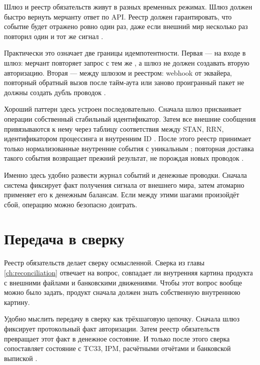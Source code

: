 Шлюз и реестр обязательств живут в разных временных режимах. Шлюз должен быстро
вернуть мерчанту ответ по API. Реестр должен гарантировать, что событие
будет отражено ровно один раз, даже если внешний мир несколько раз
повторил один и тот же сигнал \cite{stripe-idempotency,adyen-api-idempotency}.

Практически это означает две границы идемпотентности. Первая —
на входе в шлюз: мерчант повторяет запрос с тем же
, а шлюз не должен создавать вторую
авторизацию. Вторая — между шлюзом и реестром: webhook от эквайера,
повторный обратный вызов после тайм-аута или заново проигранный пакет не должны
создать дубль проводок \cite{stripe-idempotency,adyen-api-idempotency,stripe-webhooks}.

Хороший паттерн здесь устроен последовательно. Сначала шлюз
присваивает операции собственный стабильный идентификатор. Затем
все внешние сообщения привязываются к нему через таблицу соответствия
между STAN, RRN, идентификатором процессинга и внутренним ID
\cite{fis-iso8583-guide-2023}.
После этого реестр принимает только нормализованные внутренние
события с уникальным ; повторная доставка
такого события возвращает прежний результат, не порождая новых
проводок \cite{stripe-webhooks}.

Именно здесь удобно развести журнал событий и денежные проводки.
Сначала система фиксирует факт получения сигнала от внешнего мира,
затем атомарно применяет его к денежным балансам. Если между этими
шагами произойдёт сбой, операцию можно безопасно доиграть.

\section{Передача в сверку}
\label{sec:ledger-handoff}

Реестр обязательств делает сверку осмысленной.
Сверка из главы \ref{ch:reconciliation} отвечает на вопрос,
совпадает ли внутренняя картина продукта с внешними файлами
и банковскими движениями. Чтобы этот вопрос вообще можно было
задать, продукт сначала должен знать собственную внутреннюю картину.

Удобно мыслить передачу в сверку как трёхшаговую цепочку. Сначала
шлюз фиксирует протокольный факт авторизации. Затем реестр
обязательств превращает этот факт в денежное состояние. И только
после этого сверка сопоставляет состояние с TC33, IPM,
расчётными отчётами и банковской выпиской
\cite{visa-core-rules,mc-tpr,mc-switching-services}.

